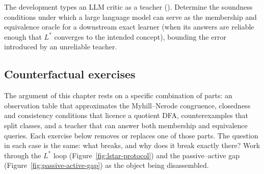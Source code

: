 \begin{openprob}
\label{op:llm-teacher}
The development types an LLM critic as a teacher ().  Determine the soundness conditions under which a large language model can serve as the membership and equivalence oracle for a downstream exact learner (when its answers are reliable enough that $L^*$ converges to the intended concept), bounding the error introduced by an unreliable teacher.
\end{openprob}


\subsection*{Counterfactual exercises}

The argument of this chapter rests on a specific combination of parts: an observation table that approximates the Myhill--Nerode congruence, closedness and consistency conditions that licence a quotient DFA, counterexamples that split classes, and a teacher that can answer both membership and equivalence queries. Each exercise below removes or replaces one of those parts. The question in each case is the same: what breaks, and why does it break exactly there? Work through the $L^*$ loop (Figure~\ref{fig:lstar-protocol}) and the passive--active gap (Figure~\ref{fig:passive-active-gap}) as the object being disassembled.

